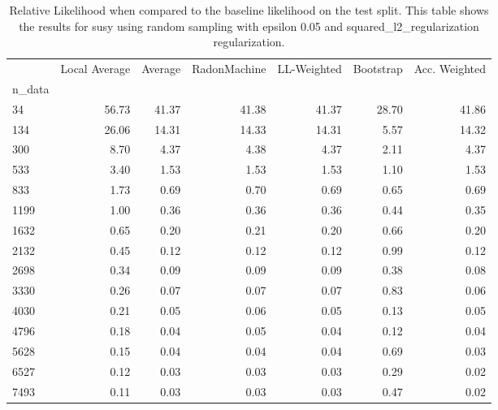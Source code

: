 \begin{table}
\centering
\caption{Relative Likelihood when compared to the baseline likelihood on the test split. This table shows the results for  susy using  random sampling with epsilon  0.05 and  squared_l2_regularization regularization.}
\label{tab:11}
\begin{tabular}{lrrrrrr}
\toprule
{} &  Local Average &  Average &  RadonMachine &  LL-Weighted &  Bootstrap &  Acc. Weighted \\
n\_data &                &          &               &              &            &                \\
\midrule
34     &          56.73 &    41.37 &         41.38 &        41.37 &      28.70 &          41.86 \\
134    &          26.06 &    14.31 &         14.33 &        14.31 &       5.57 &          14.32 \\
300    &           8.70 &     4.37 &          4.38 &         4.37 &       2.11 &           4.37 \\
533    &           3.40 &     1.53 &          1.53 &         1.53 &       1.10 &           1.53 \\
833    &           1.73 &     0.69 &          0.70 &         0.69 &       0.65 &           0.69 \\
1199   &           1.00 &     0.36 &          0.36 &         0.36 &       0.44 &           0.35 \\
1632   &           0.65 &     0.20 &          0.21 &         0.20 &       0.66 &           0.20 \\
2132   &           0.45 &     0.12 &          0.12 &         0.12 &       0.99 &           0.12 \\
2698   &           0.34 &     0.09 &          0.09 &         0.09 &       0.38 &           0.08 \\
3330   &           0.26 &     0.07 &          0.07 &         0.07 &       0.83 &           0.06 \\
4030   &           0.21 &     0.05 &          0.06 &         0.05 &       0.13 &           0.05 \\
4796   &           0.18 &     0.04 &          0.05 &         0.04 &       0.12 &           0.04 \\
5628   &           0.15 &     0.04 &          0.04 &         0.04 &       0.69 &           0.03 \\
6527   &           0.12 &     0.03 &          0.03 &         0.03 &       0.29 &           0.02 \\
7493   &           0.11 &     0.03 &          0.03 &         0.03 &       0.47 &           0.02 \\
\bottomrule
\end{tabular}
\end{table}
